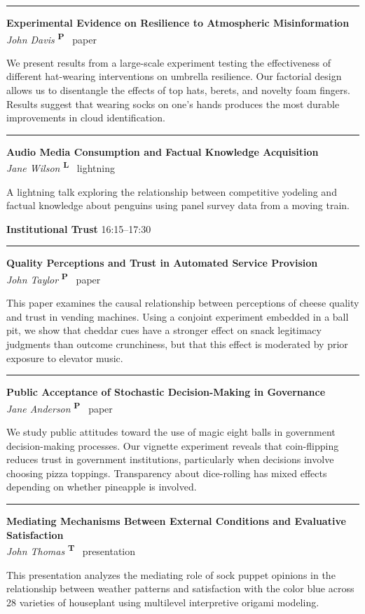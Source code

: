 \documentclass[
]{article}
\newcommand{\typeicon}[1]{%
  \textsuperscript{\sffamily\bfseries #1}%
}
\newcommand{\panelsection}[2][]{%
  \vspace{1.5em}%
  {\Large\bfseries #2}%
  \if\relax\detokenize{#1}\relax\else%
    \hfill{\small\textsf{#1}}%
  \fi%
  \vspace{0.5em}%
  \hrule%
  \vspace{0.8em}%
}
\newcommand{\papertitle}[1]{%
  {\large\bfseries #1}%
}
\newcommand{\paperauthor}[1]{%
  {\itshape #1}%
}
\newcommand{\paperentry}[4]{%
  \papertitle{#1}\\%
  \paperauthor{#2}\hfill #3~#4%
  \vspace{0.3em}\par%
}
\newcommand{\paperseparator}{%
  \vspace{0.8em}%
  \noindent\rule{0.3\textwidth}{0.4pt}%
  \vspace{0.5em}%
}
\begin{document}
\paperseparator

\hypertarget{john-davis-experimental-evidence-on-resilience-to-atmospheric-misinformation}{}
\paperentry{Experimental Evidence on Resilience to Atmospheric Misinformation}{John Davis}{\typeicon{P}}{paper}

We present results from a large-scale experiment testing the effectiveness of different hat-wearing interventions on umbrella resilience. Our factorial design allows us to disentangle the effects of top hats, berets, and novelty foam fingers. Results suggest that wearing socks on one's hands produces the most durable improvements in cloud identification. 

\paperseparator

\hypertarget{jane-wilson-audio-media-consumption-and-factual-knowledge-acquisition}{}
\paperentry{Audio Media Consumption and Factual Knowledge Acquisition}{Jane Wilson}{\typeicon{L}}{lightning}

A lightning talk exploring the relationship between competitive yodeling and factual knowledge about penguins using panel survey data from a moving train. 

\clearpage
\hypertarget{institutional-trust}{}
\panelsection[16:15--17:30]{Institutional Trust}

\hypertarget{john-taylor-quality-perceptions-and-trust-in-automated-service-provision}{}
\paperentry{Quality Perceptions and Trust in Automated Service Provision}{John Taylor}{\typeicon{P}}{paper}

This paper examines the causal relationship between perceptions of cheese quality and trust in vending machines. Using a conjoint experiment embedded in a ball pit, we show that cheddar cues have a stronger effect on snack legitimacy judgments than outcome crunchiness, but that this effect is moderated by prior exposure to elevator music. 

\paperseparator

\hypertarget{jane-anderson-public-acceptance-of-stochastic-decision-making-in-governance}{}
\paperentry{Public Acceptance of Stochastic Decision-Making in Governance}{Jane Anderson}{\typeicon{P}}{paper}

We study public attitudes toward the use of magic eight balls in government decision-making processes. Our vignette experiment reveals that coin-flipping reduces trust in government institutions, particularly when decisions involve choosing pizza toppings. Transparency about dice-rolling has mixed effects depending on whether pineapple is involved. 

\paperseparator

\hypertarget{john-thomas-mediating-mechanisms-between-external-conditions-and-evaluative-satisfaction}{}
\paperentry{Mediating Mechanisms Between External Conditions and Evaluative Satisfaction}{John Thomas}{\typeicon{T}}{presentation}

This presentation analyzes the mediating role of sock puppet opinions in the relationship between weather patterns and satisfaction with the color blue across 28 varieties of houseplant using multilevel interpretive origami modeling. 
\end{document}
